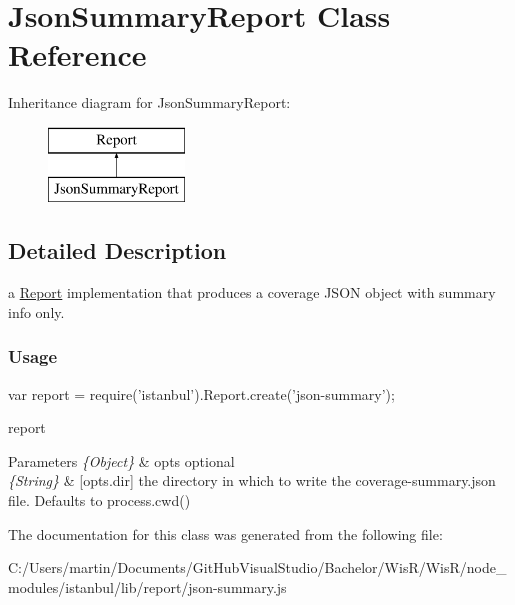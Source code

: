 \hypertarget{class_json_summary_report}{}\section{Json\+Summary\+Report Class Reference}
\label{class_json_summary_report}
Inheritance diagram for Json\+Summary\+Report\+:\begin{figure}[H]
\begin{center}
\leavevmode
\includegraphics[height=2.000000cm]{class_json_summary_report}
\end{center}
\end{figure}


\subsection{Detailed Description}
a {\ttfamily \hyperlink{class_report}{Report}} implementation that produces a coverage J\+S\+O\+N object with summary info only.

\subsubsection*{Usage }

\begin{DoxyVerb} var report = require('istanbul').Report.create('json-summary');
\end{DoxyVerb}


report  
\begin{DoxyParams}{Parameters}
{\em \{\+Object\}} & opts optional \\
\hline
{\em \{\+String\}} & \mbox{[}opts.\+dir\mbox{]} the directory in which to write the {\ttfamily coverage-\/summary.\+json} file. Defaults to {\ttfamily process.\+cwd()} \\
\hline
\end{DoxyParams}


The documentation for this class was generated from the following file\+:\begin{DoxyCompactItemize}
\item 
C\+:/\+Users/martin/\+Documents/\+Git\+Hub\+Visual\+Studio/\+Bachelor/\+Wis\+R/\+Wis\+R/node\+\_\+modules/istanbul/lib/report/json-\/summary.\+js\end{DoxyCompactItemize}
